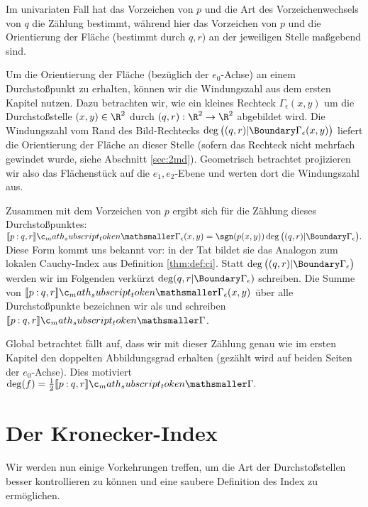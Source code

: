\documentclass{mythesis}
\begin{document}
Im univariaten Fall hat das Vorzeichen von $p$ und die Art des Vorzeichenwechsels von $q$ die Zählung bestimmt, während hier das Vorzeichen von $p$ und die Orientierung der Fläche (bestimmt durch $q, r$) an der jeweiligen Stelle maßgebend sind.

Um die Orientierung der Fläche (bezüglich der $e_0$-Achse) an einem Durchstoßpunkt zu erhalten, können wir die Windungszahl aus dem ersten Kapitel nutzen.
Dazu betrachten wir, wie ein kleines Rechteck $\Gamma_\epsilon(x,y)$ um die Durchstoßstelle $(x,y) \in \R^2$ durch $(q, r): \R^2 \to \R^2$ abgebildet wird.
Die Windungszahl vom Rand des Bild-Rechtecks $\deg\big((q,r)|\Boundary\Gamma_\epsilon(x,y)\big)$ liefert die Orientierung der Fläche an dieser Stelle (sofern das Rechteck nicht mehrfach gewindet wurde, siehe Abschnitt \ref{sec:2md}).
Geometrisch betrachtet projizieren wir also das Flächenstück auf die $e_1,e_2$-Ebene und werten dort die Windungszahl aus.

Zusammen mit dem Vorzeichen von $p$ ergibt sich für die Zählung dieses Durchstoßpunktes:
\begin{math}
    \Index{\Gamma_\epsilon(x,y)}{p}{q,r}
    = \sgn(p(x,y)) \deg\big((q,r)|\Boundary\Gamma_\epsilon\big).
\end{math}
Diese Form kommt uns bekannt vor: in der Tat bildet sie das Analogon zum lokalen Cauchy-Index aus Definition \ref{thm:def:ci}.
Statt $\deg\big((q,r)|\Boundary\Gamma_\epsilon\big)$ werden wir im Folgenden verkürzt $\deg(q,r|\Boundary\Gamma_\epsilon)$ schreiben.
Die Summe von $\Index{\Gamma_\epsilon(x,y)}{p}{q,r}$ über alle Durchstoßpunkte bezeichnen wir als  und schreiben $\Index{\Gamma}{p}{q,r}$.

Global betrachtet fällt auf, dass wir mit dieser Zählung genau wie im ersten Kapitel den doppelten Abbildungsgrad erhalten (gezählt wird auf beiden Seiten der $e_0$-Achse).
Dies motiviert
\begin{math}
    \deg(f) = \frac{1}{2} \Index{\Gamma}{p}{q,r}.
\end{math}


\section{Der Kronecker-Index}

Wir werden nun einige Vorkehrungen treffen, um die Art der Durchstoßstellen besser kontrollieren zu können und eine saubere Definition des Index zu ermöglichen.

\end{document}

